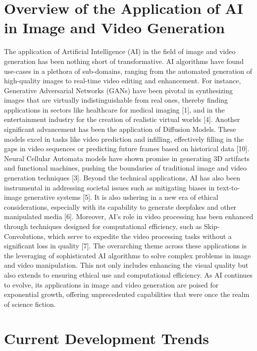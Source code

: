 \documentclass[11pt,a4paper,oneside]{report}
\begin{document}
{\section{Overview of the Application of AI in Image and Video Generation}
The application of Artificial Intelligence (AI) in the field of image and video generation has been nothing short of transformative. AI algorithms have found use-cases in a plethora of sub-domains, ranging from the automated generation of high-quality images to real-time video editing and enhancement. For instance, Generative Adversarial Networks (GANs) have been pivotal in synthesizing images that are virtually indistinguishable from real ones, thereby finding applications in sectors like healthcare for medical imaging [1], and in the entertainment industry for the creation of realistic virtual worlds [4]. Another significant advancement has been the application of Diffusion Models. These models excel in tasks like video prediction and infilling, effectively filling in the gaps in video sequences or predicting future frames based on historical data [10]. Neural Cellular Automata models have shown promise in generating 3D artifacts and functional machines, pushing the boundaries of traditional image and video generation techniques [3]. 
Beyond the technical applications, AI has also been instrumental in addressing societal issues such as mitigating biases in text-to- image generative systems [5]. It is also ushering in a new era of ethical considerations, especially with its capability to generate deepfakes and other manipulated media [6]. Moreover, AI's role in video processing has been enhanced through techniques designed for computational efficiency, such as Skip- Convolutions, which serve to expedite the video processing tasks without a significant loss in quality [7]. 
The overarching theme across these applications is the leveraging of sophisticated AI algorithms to solve complex problems in image and video manipulation. This not only includes enhancing the visual quality but also extends to ensuring ethical use and computational efficiency. As AI continues to evolve, its applications in image and video generation are poised for exponential growth, offering unprecedented capabilities that were once the realm of science fiction. 

\section{Current Development Trends}

}
\end{document}
